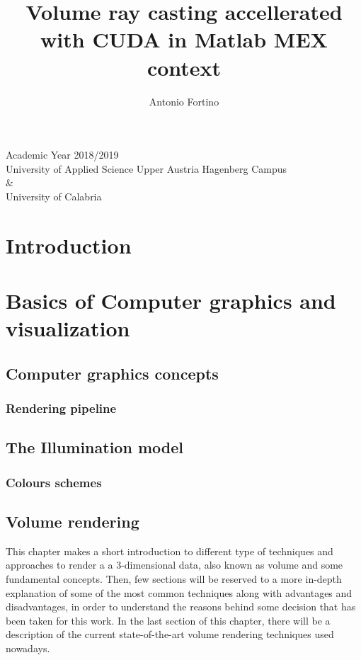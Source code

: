 \documentclass[10pt,a4paper]{article}
\author{Antonio Fortino}
\title{Volume ray casting accellerated with CUDA in Matlab MEX context}
\begin{document}
\maketitle
\begin{center}
Academic Year 2018/2019\\
University of Applied Science Upper Austria Hagenberg Campus\\
\&\\
University of Calabria
\end{center}
\pagebreak
\tableofcontents
\pagebreak
\section{Introduction} %

\section{Basics of Computer graphics and visualization}
\subsection{Computer graphics concepts} %
\subsubsection{Rendering pipeline} %
\subsection{The Illumination model} %
\subsubsection{Colours schemes} %
\pagebreak
\subsection{Volume rendering} 
This chapter makes a short introduction to different type of techniques and approaches to render a a 3-dimensional data, also known as volume and some fundamental concepts. Then, few sections will be reserved to a more in-depth explanation of some of the most common techniques along with advantages and disadvantages, in order to understand the reasons behind some decision that has been taken for this work. In the last section of this chapter, there will be a description of the current state-of-the-art volume rendering techniques used nowadays.
\end{document}
